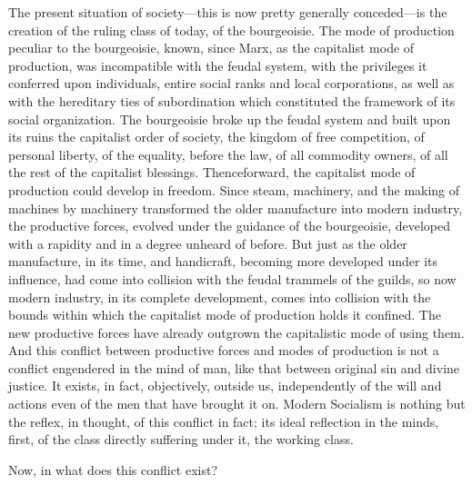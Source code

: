 The present situation of society---this is now pretty generally conceded---is
the creation of the ruling class of today, of the bourgeoisie. The mode of
production peculiar to the bourgeoisie, known, since Marx, as the capitalist
mode of production, was incompatible with the feudal system, with the privileges
it conferred upon individuals, entire social ranks and local corporations, as
well as with the hereditary ties of subordination which constituted the
framework of its social organization. The bourgeoisie broke up the feudal system
and built upon its ruins the capitalist order of society, the kingdom of free
competition, of personal liberty, of the equality, before the law, of all
commodity owners, of all the rest of the capitalist blessings. Thenceforward,
the capitalist mode of production could develop in freedom. Since steam,
machinery, and the making of machines by machinery transformed the older
manufacture into modern industry, the productive forces, evolved under the
guidance of the bourgeoisie, developed with a rapidity and in a degree unheard
of before. But just as the older manufacture, in its time, and handicraft,
becoming more developed under its influence, had come into collision with the
feudal trammels of the guilds, so now modern industry, in its complete
development, comes into collision with the bounds within which the capitalist
mode of production holds it confined. The new productive forces have already
outgrown the capitalistic mode of using them. And this conflict between
productive forces and modes of production is not a conflict engendered in the
mind of man, like that between original sin and divine justice. It exists, in
fact, objectively, outside us, independently of the will and actions even of the
men that have brought it on. Modern Socialism is nothing but the reflex, in
thought, of this conflict in fact; its ideal reflection in the minds, first, of
the class directly suffering under it, the working class.

Now, in what does this conflict exist?

